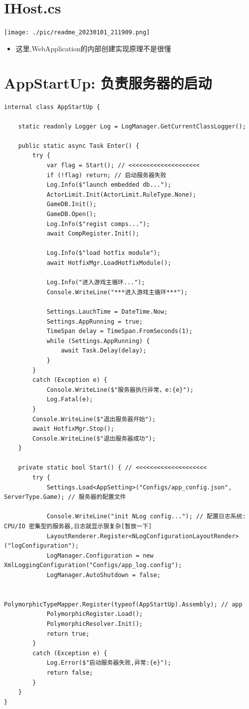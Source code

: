 \documentclass[9pt, b5paper]{article}
\begin{document}
\section{IHost.cs}
\label{sec-3}

\texttt{[image: ./pic/readme\_20230101\_211909.png]}
\begin{itemize}
\item 这里,WebApplication的内部创建实现原理不是很懂
\end{itemize}

\section{AppStartUp: 负责服务器的启动}
\label{sec-4}
\begin{verbatim}
internal class AppStartUp {

    static readonly Logger Log = LogManager.GetCurrentClassLogger();

    public static async Task Enter() {
        try {
            var flag = Start(); // <<<<<<<<<<<<<<<<<<<< 
            if (!flag) return; // 启动服务器失败
            Log.Info($"launch embedded db...");
            ActorLimit.Init(ActorLimit.RuleType.None);
            GameDB.Init();
            GameDB.Open();
            Log.Info($"regist comps...");
            await CompRegister.Init();

            Log.Info($"load hotfix module");
            await HotfixMgr.LoadHotfixModule();

            Log.Info("进入游戏主循环...");
            Console.WriteLine("***进入游戏主循环***");

            Settings.LauchTime = DateTime.Now;
            Settings.AppRunning = true;
            TimeSpan delay = TimeSpan.FromSeconds(1);
            while (Settings.AppRunning) {
                await Task.Delay(delay);
            }
        }
        catch (Exception e) {
            Console.WriteLine($"服务器执行异常，e:{e}");
            Log.Fatal(e);
        }
        Console.WriteLine($"退出服务器开始");
        await HotfixMgr.Stop();
        Console.WriteLine($"退出服务器成功");
    }

    private static bool Start() { // <<<<<<<<<<<<<<<<<<<< 
        try {
            Settings.Load<AppSetting>("Configs/app_config.json", ServerType.Game); // 服务器的配置文件 

            Console.WriteLine("init NLog config..."); // 配置日志系统:　CPU/IO 密集型的服务器,日志就显示狠复杂[暂放一下]
            LayoutRenderer.Register<NLogConfigurationLayoutRender>("logConfiguration");
            LogManager.Configuration = new XmlLoggingConfiguration("Configs/app_log.config");
            LogManager.AutoShutdown = false;

            PolymorphicTypeMapper.Register(typeof(AppStartUp).Assembly); // app
            PolymorphicRegister.Load();
            PolymorphicResolver.Init();
            return true;
        }
        catch (Exception e) {
            Log.Error($"启动服务器失败,异常:{e}");
            return false;
        }
    }
}
\end{verbatim}
\end{document}
